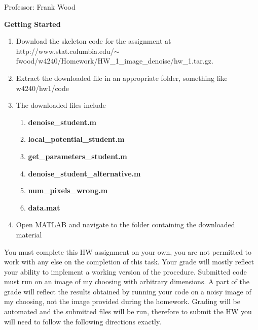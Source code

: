 \documentclass[12pt]{article}
\begin{document}

\begin{center}
	Professor: Frank Wood
\end{center}


{\bf Getting Started}
\begin{enumerate}
	\item Download the skeleton code for the assignment at \newline http://www.stat.columbia.edu/$\sim$fwood/w4240/Homework/HW\_1\_image\_denoise/hw\_1.tar.gz.
	\item Extract the downloaded file in an appropriate folder, something like w4240/hw1/code
	\item { The downloaded files include 
		 \begin{enumerate}
			\item {\bf denoise\_student.m}
			\item {\bf local\_potential\_student.m}
			\item {\bf get\_parameters\_student.m}
			\item {\bf denoise\_student\_alternative.m}
			\item{\bf num\_pixels\_wrong.m}
			\item {\bf data.mat}
		\end{enumerate}
	}
	\item Open MATLAB and navigate to the folder containing the downloaded material
\end{enumerate}

You must complete this HW assignment on your own, you are not permitted to work with any else on the completion of this task.  Your grade will mostly reflect your ability to implement a working version of the procedure.  Submitted code must run on an image of my choosing with arbitrary dimensions.  A part of the grade will reflect the results obtained by running your code on a noisy image of my choosing, not the image provided during the homework.  Grading will be automated and the submitted files will be run, therefore to submit the HW you will need to follow the following directions exactly.
\end{document}
